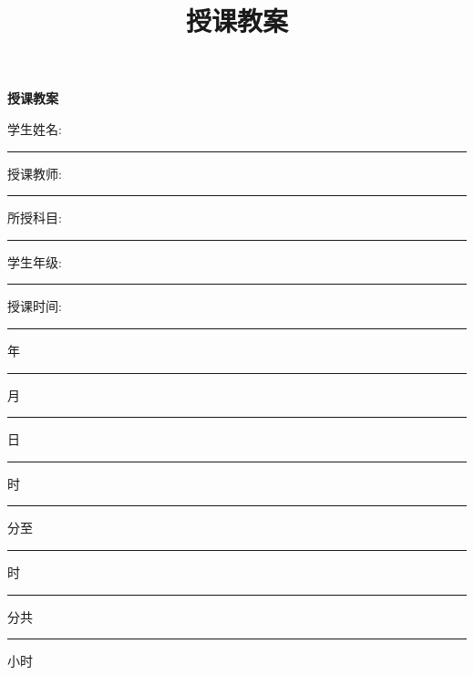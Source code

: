 \documentclass{article}
\title{授课教案}
\begin{document}
    \newpage
    
    \begin{center}
        \textbf{\LARGE 授课教案}
    \end{center}
    
    \vspace{1.5em}

    \begin{center}
        学生姓名: \rule[-0.1em]{4em}{0.01em} \hspace{7em}  授课教师: \rule[-0.1em]{4em}{0.01em} \hspace{7em} 所授科目: \rule[-0.1em]{4em}{0.01em}

        \vspace{1.5em}

        学生年级: \rule[-0.1em]{4em}{0.01em} \hspace{3em}  授课时间: \rule[-0.1em]{2em}{0.01em} 年 \rule[-0.1em]{1em}{0.01em} 月 
        \rule[-0.1em]{1em}{0.01em} 日 \rule[-0.1em]{1em}{0.01em} 时 \rule[-0.1em]{1em}{0.01em} 分至 \rule[-0.1em]{1em}{0.01em} 时
        \rule[-0.1em]{1em}{0.01em} 分共 \rule[-0.1em]{1em}{0.01em} 小时
    \end{center}

    \vspace{1em}        
    
\end{document}
